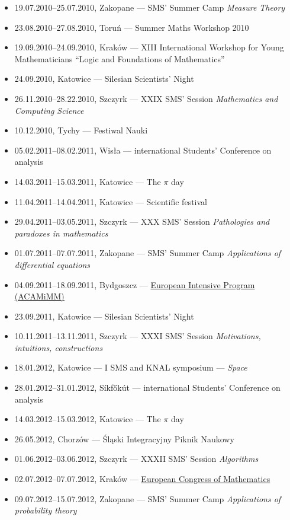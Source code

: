 \begin{itemize}
  \item 19.07.2010--25.07.2010, Zakopane ---  SMS' Summer Camp \textsl{Measure Theory}
  \item 23.08.2010--27.08.2010, Toruń --- Summer Maths Workshop 2010
  \item 19.09.2010--24.09.2010, Kraków --- XIII International Workshop for Young Mathematicians ``Logic and Foundations of Mathematics''
  \item 24.09.2010, Katowice --- Silesian Scientists' Night
  \item 26.11.2010--28.22.2010, Szczyrk --- XXIX SMS' Session \textsl{Mathematics and Computing Science}
  \item 10.12.2010, Tychy --- Festiwal Nauki
  \item 05.02.2011--08.02.2011, Wisła ---  international Students' Conference on analysis
  \item 14.03.2011--15.03.2011, Katowice --- The $\pi$ day
  \item 11.04.2011--14.04.2011, Katowice --- Scientific festival
  \item 29.04.2011--03.05.2011, Szczyrk --- XXX SMS' Session \textsl{Pathologies and paradoxes in mathematics}
  \item 01.07.2011--07.07.2011, Zakopane ---  SMS' Summer Camp \textsl{Applications of differential equations}
  \item 04.09.2011--18.09.2011, Bydgoszcz --- \href{\urlAcamimm}{European Intensive Program (ACAMiMM)}
  \item 23.09.2011, Katowice --- Silesian Scientists' Night
  \item 10.11.2011--13.11.2011, Szczyrk --- XXXI SMS' Session \textsl{Motivations, intuitions, constructions}
  \item 18.01.2012, Katowice --- I SMS and KNAL symposium --- \textsl{Space}
  \item 28.01.2012--31.01.2012, Síkfőkút ---  international Students' Conference on analysis
  \item 14.03.2012--15.03.2012, Katowice --- The $\pi$ day
  \item 26.05.2012, Chorzów --- Śląski Integracyjny Piknik Naukowy
  \item 01.06.2012--03.06.2012, Szczyrk --- XXXII SMS' Session \textsl{Algorithms}
  \item 02.07.2012--07.07.2012, Kraków --- \href{http://www.6ecm.pl/en}{ European Congress of Mathematics}
  \item 09.07.2012--15.07.2012, Zakopane ---  SMS' Summer Camp \textsl{Applications of probability theory}

\end{itemize}
